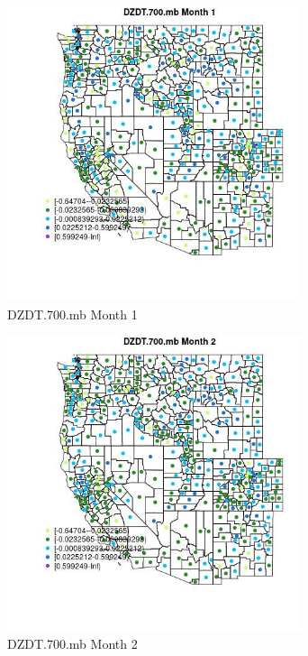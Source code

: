 \begin{figure} 
\centering  
\includegraphics[width=0.77\textwidth]{Code_Outputs/df_report_ML_predictors_CountyCentroid_Locations_Dates_2008-01-01to2018-12-31_MapObsMo1DZDT700mb.jpg} 
\caption{\label{fig:df_report_ML_predictors_CountyCentroid_Locations_Dates_2008-01-01to2018-12-31MapObsMo1DZDT700mb}DZDT.700.mb Month 1} 
\end{figure} 
 

\begin{figure} 
\centering  
\includegraphics[width=0.77\textwidth]{Code_Outputs/df_report_ML_predictors_CountyCentroid_Locations_Dates_2008-01-01to2018-12-31_MapObsMo2DZDT700mb.jpg} 
\caption{\label{fig:df_report_ML_predictors_CountyCentroid_Locations_Dates_2008-01-01to2018-12-31MapObsMo2DZDT700mb}DZDT.700.mb Month 2} 
\end{figure} 
 

